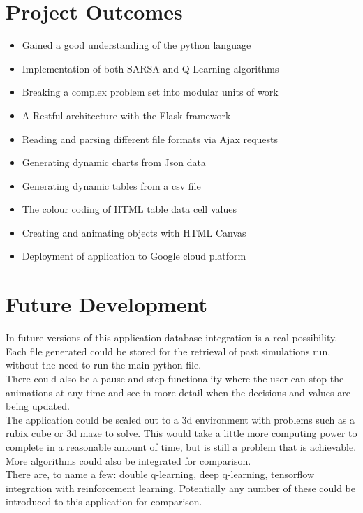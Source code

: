 \section{Project Outcomes}
\begin{itemize}
	\item Gained a good understanding of the python language
	\item Implementation of both SARSA and Q-Learning algorithms
	\item Breaking a complex problem set into modular units of work
	\item A Restful architecture with the Flask framework
	\item Reading and parsing different file formats via Ajax requests
	\item Generating dynamic charts from Json data
	\item Generating dynamic tables from a csv file
	\item The colour coding of HTML table data cell values
	\item Creating and animating objects with HTML Canvas
	\item Deployment of application to Google cloud platform
\end{itemize}

\section{Future Development}

In future versions of this application database integration is a real possibility. Each file generated could be stored for the retrieval of past simulations run, without the need to run the main python file.\\

There could also be a pause and step functionality where the user can stop the animations at any time and see in more detail when the decisions and values are being updated.\\

The application could be scaled out to a 3d environment with problems such as a rubix cube or 3d maze to solve. This would take a little more computing power to complete in a reasonable amount of time, but is still a problem that is achievable.\\

More algorithms could also be integrated for comparison.\\ There are, to name a few: double q-learning, deep q-learning, tensorflow integration with reinforcement learning.  Potentially any number of these could be introduced to this application for comparison.\\

